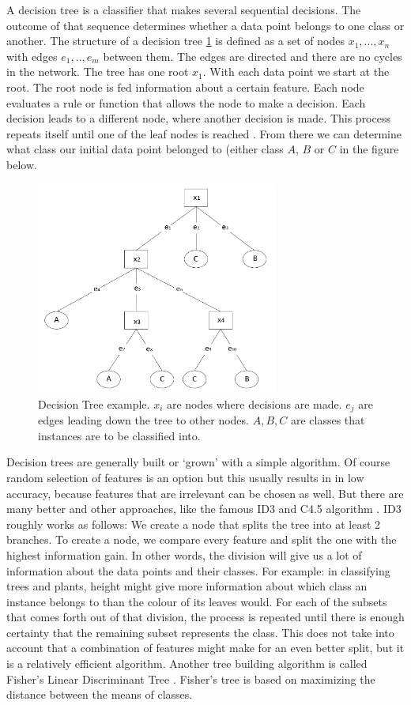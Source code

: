 A decision tree is a classifier that makes several sequential decisions. The outcome of that sequence determines whether a data point belongs to one class or another. The structure of a decision tree \ref{fig:DT} is defined as a set of nodes ${x_1, ... , x_n}$ with edges ${e_1, .., e_{m}}$ between them. The edges are directed and there are no cycles in the network. The tree has one root $x_1$. With each data point we start at the root. The root node is fed information about a certain feature. Each node evaluates a rule or function that allows the node to make a decision. Each decision leads to a different node, where another decision is made. This process repeats itself until one of the leaf nodes is reached \cite{safavian1991survey}. From there we can determine what class our initial data point belonged to (either class $A$, $B$ or $C$ in the figure below. 

\begin{figure}[H]
    \includegraphics[width=80mm]{./img/decisiontree.png}
    \caption{\footnotesize{Decision Tree example. $x_i$ are nodes where decisions are made. $e_j$ are edges leading down the tree to other nodes. $A,B,C$ are classes that instances are to be classified into.}}
    \label{fig:DT}
\end{figure}

Decision trees are generally built or `grown' with a simple algorithm. Of course random selection of features is an option but this usually results in in low accuracy, because features that are irrelevant can be chosen as well. But there are many better and other approaches, like the famous ID3 and C4.5 algorithm \cite{niuniu2010review}. ID3 roughly works as follows: We create a node that splits the tree into at least 2 branches. To create a node, we compare every feature and split the one with the highest information gain. In other words, the division will give us a lot of information about the data points and their classes. For example: in classifying trees and plants, height might give more information about which class an instance belongs to than the colour of its leaves would. For each of the subsets that comes forth out of that division, the process is repeated until there is enough certainty that the remaining subset represents the class. This does not take into account that a combination of features might make for an even better split, but it is a relatively efficient algorithm. Another tree building algorithm is called Fisher's Linear Discriminant Tree \cite{LópezChau20136283}. Fisher's tree is based on maximizing the distance between the means of classes. 

